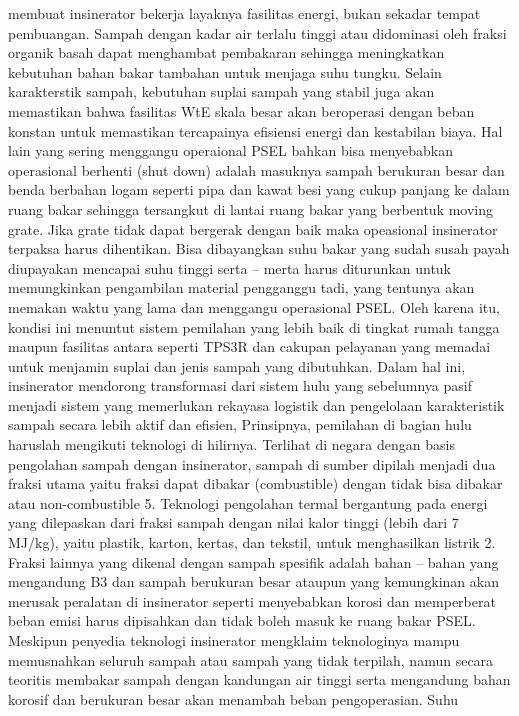\documentclass[
  letterpaper,
  DIV=11,
  numbers=noendperiod]{scrreprt}
\begin{document}
membuat insinerator bekerja layaknya fasilitas energi, bukan sekadar
tempat pembuangan. Sampah dengan kadar air terlalu tinggi atau
didominasi oleh fraksi organik basah dapat menghambat pembakaran
sehingga meningkatkan kebutuhan bahan bakar tambahan untuk menjaga suhu
tungku. Selain karakterstik sampah, kebutuhan suplai sampah yang stabil
juga akan memastikan bahwa fasilitas WtE skala besar akan beroperasi
dengan beban konstan untuk memastikan tercapainya efisiensi energi dan
kestabilan biaya. Hal lain yang sering menggangu operaional PSEL bahkan
bisa menyebabkan operasional berhenti (shut down) adalah masuknya sampah
berukuran besar dan benda berbahan logam seperti pipa dan kawat besi
yang cukup panjang ke dalam ruang bakar sehingga tersangkut di lantai
ruang bakar yang berbentuk moving grate. Jika grate tidak dapat bergerak
dengan baik maka opeasional insinerator terpaksa harus dihentikan. Bisa
dibayangkan suhu bakar yang sudah susah payah diupayakan mencapai suhu
tinggi serta -- merta harus diturunkan untuk memungkinkan pengambilan
material pengganggu tadi, yang tentunya akan memakan waktu yang lama dan
menggangu operasional PSEL. Oleh karena itu, kondisi ini menuntut sistem
pemilahan yang lebih baik di tingkat rumah tangga maupun fasilitas
antara seperti TPS3R dan cakupan pelayanan yang memadai untuk menjamin
suplai dan jenis sampah yang dibutuhkan. Dalam hal ini, insinerator
mendorong transformasi dari sistem hulu yang sebelumnya pasif menjadi
sistem yang memerlukan rekayasa logistik dan pengelolaan karakteristik
sampah secara lebih aktif dan efisien, Prinsipnya, pemilahan di bagian
hulu haruslah mengikuti teknologi di hilirnya. Terlihat di negara dengan
basis pengolahan sampah dengan insinerator, sampah di sumber dipilah
menjadi dua fraksi utama yaitu fraksi dapat dibakar (combustible) dengan
tidak bisa dibakar atau non-combustible 5. Teknologi pengolahan termal
bergantung pada energi yang dilepaskan dari fraksi sampah dengan nilai
kalor tinggi (lebih dari 7 MJ/kg), yaitu plastik, karton, kertas, dan
tekstil, untuk menghasilkan listrik 2. Fraksi lainnya yang dikenal
dengan sampah spesifik adalah bahan -- bahan yang mengandung B3 dan
sampah berukuran besar ataupun yang kemungkinan akan merusak peralatan
di insinerator seperti menyebabkan korosi dan memperberat beban emisi
harus dipisahkan dan tidak boleh masuk ke ruang bakar PSEL. Meskipun
penyedia teknologi insinerator mengklaim teknologinya mampu memusnahkan
seluruh sampah atau sampah yang tidak terpilah, namun secara teoritis
membakar sampah dengan kandungan air tinggi serta mengandung bahan
korosif dan berukuran besar akan menambah beban pengoperasian. Suhu
\end{document}
